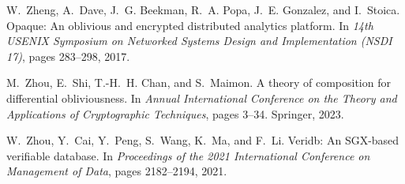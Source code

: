 \documentclass[11pt]{article}
\begin{document}
\begin{thebibliography}{140}
\begin{small}
W.~Zheng, A.~Dave, J.~G. Beekman, R.~A. Popa, J.~E. Gonzalez, and I.~Stoica.
\newblock Opaque: An oblivious and encrypted distributed analytics platform.
\newblock In {\em 14th USENIX Symposium on Networked Systems Design and
  Implementation (NSDI 17)}, pages 283--298, 2017.

M.~Zhou, E.~Shi, T.-H.~H. Chan, and S.~Maimon.
\newblock A theory of composition for differential obliviousness.
\newblock In {\em Annual International Conference on the Theory and
  Applications of Cryptographic Techniques}, pages 3--34. Springer, 2023.

W.~Zhou, Y.~Cai, Y.~Peng, S.~Wang, K.~Ma, and F.~Li.
\newblock Veridb: An {SGX}-based verifiable database.
\newblock In {\em Proceedings of the 2021 International Conference on
  Management of Data}, pages 2182--2194, 2021.

\end{small}
\end{thebibliography}
\end{document}
